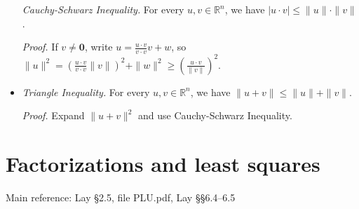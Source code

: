 \documentclass[11pt]{article}
\newcommand{\1}{\mathbf{1}}
\newcommand{\0}{\mathbf{0}}
\newcommand{\R}{\mathbb{R}}
\DeclareMathOperator{\myspan}{\mathsf{span}}
\DeclareMathOperator{\mydot}{\boldsymbol{\cdot}}
\renewcommand{\leq}{\leqslant}
\renewcommand{\geq}{\geqslant}
\begin{document}
\begin{itemize}
\emph{Cauchy-Schwarz Inequality.}
For every $u,v\in \R^n$, we have $|u \mydot v| \leq \|u\|\cdot\| v\|$.

\emph{Proof.}
If $v \ne \0$,
write
$u = \frac{u \mydot v}{v \mydot v}v + w$,
so
$\|u\|^2 = (\frac{u \mydot v}{v \mydot v}\|v\|)^2 + \|w\|^2 \geq (\frac{u \mydot v}{\|v\|})^2$.



\item

\emph{Triangle Inequality.}
For every $u,v\in \R^n$, we have $\|u+v\| \leq \|u\| + \|v\|$.

\emph{Proof.}
Expand $\|u+v\|^2$ and use Cauchy-Schwarz Inequality.

\end{itemize}


\clearpage
\section{Factorizations and least squares}

Main reference:
Lay \S2.5, file PLU.pdf, Lay \S\S6.4--6.5
\end{document}

